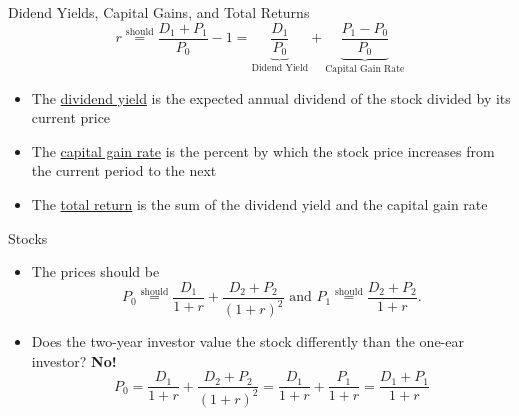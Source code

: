 \documentclass{beamer}
\newcommand{\should}{\overset{\text{should}}{=}}
\begin{document}
\begin{frame}{Didend Yields, Capital Gains, and Total Returns}
\begin{equation*}
r\should\frac{D_{1}+P_{1}}{P_{0}}-1=\underbrace{\frac{D_{1}}{P_{0}}}_{\text{Didend Yield}}+\underbrace{\frac{P_{1}-P_{0}}{P_{0}}}_{\text{Capital Gain Rate}}
\end{equation*}
\begin{itemize}
\item The \underline{dividend yield} is the expected annual dividend of the stock divided by its current price 
\item The \underline{capital gain rate} is the percent by which the stock price increases from the current period to the next
\item The \underline{total return} is the sum of the dividend yield and the capital gain rate  
\end{itemize}
\end{frame}

\begin{frame}{Stocks}
	\begin{figure}[H]
		\begin{center}
		\end{center}
	\end{figure}
\begin{itemize}
\item The prices should be
\begin{equation*}
	P_{0}\should\frac{D_{1}}{1+r}+\frac{D_{2}+P_{2}}{(1+r)^2}\text{ and } P_{1}\should\frac{D_{2}+P_{2}}{1+r}.
\end{equation*}
\item Does the two-year investor value the stock differently than the one-ear investor? \textbf{No!}
\begin{equation*}
	P_{0}=\frac{D_{1}}{1+r}+\frac{D_{2}+P_{2}}{(1+r)^2}=\frac{D_{1}}{1+r}+\frac{P_{1}}{1+r}=\frac{D_{1}+P_{1}}{1+r}
\end{equation*}
\end{itemize}
\end{frame}
\end{document}
